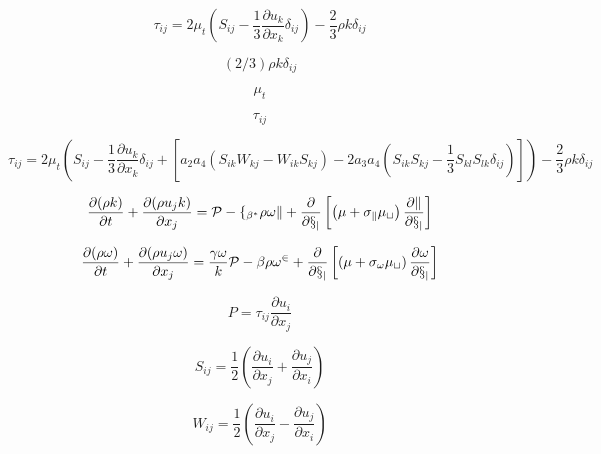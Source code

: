 

\begin{equation}
\tau_{ij} = 2 \mu_t \left(S_{ij} - \frac{1}{3} \frac{\partial u_k}{\partial x_k} \delta_{ij} \right) -
  \frac{2}{3} \rho k \delta_{ij}
\end{equation}

\begin{equation}
(2/3) \rho k \delta_{ij}
\end{equation}

\begin{equation}
\mu_t
\end{equation}

\begin{equation}
\tau_{ij}
\end{equation}

\begin{equation}
\tau_{ij} = 2 \mu_t \left(S_{ij} - \frac{1}{3} \frac{\partial u_k}{\partial x_k} \delta_{ij} 
  + \left[a_2 a_4 \left( S_{ik}W_{kj} - W_{ik}S_{kj}\right) - 2 a_3 a_4 \left(S_{ik}S_{kj} - \frac{1}{3}S_{kl}S_{lk}\delta_{ij}\right)
  \right] \right) -
  \frac{2}{3} \rho k \delta_{ij}
\end{equation}

\begin{equation}
\frac{\partial (\rho k)}{\partial t} + \frac{\partial (\rho u_j k)}{\partial x_j}
  = \cal P - f_{\beta^*} \rho \omega k  + \frac{\partial}{\partial x_j}
\left[\left(\mu + \sigma_k \mu_t \right)\frac{\partial k}{\partial x_j}\right]
\end{equation}

\begin{equation}
\frac{\partial (\rho \omega)}{\partial t} + \frac{\partial (\rho u_j \omega)}{\partial x_j}
  = \frac{\gamma \omega}{k} \cal P -
  \beta \rho \omega^2 + \frac{\partial}{\partial x_j}
  \left[ \left( \mu + \sigma_{\omega} \mu_t \right)
  \frac{\partial \omega}{\partial x_j} \right]
\end{equation}

\begin{equation}
P = \tau_{ij} \frac{\partial u_i}{\partial x_j}
\end{equation}

\begin{equation}
S_{ij} = \frac{1}{2} \left( \frac{\partial u_i}{\partial x_j} + \frac{\partial u_j}{\partial x_i} \right)
\end{equation}

\begin{equation}
W_{ij} = \frac{1}{2} \left( \frac{\partial u_i}{\partial x_j} - \frac{\partial u_j}{\partial x_i} \right)
\end{equation}

